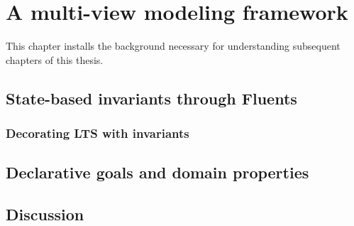 \chapter{A multi-view modeling framework\label{chapter:framework}}

This chapter installs the background necessary for understanding subsequent chapters of this thesis. 





\section{State-based invariants through Fluents}

\subsection{Decorating LTS with invariants}

\section{Declarative goals and domain properties}

\section{Discussion\label{section:background-discussion}}
